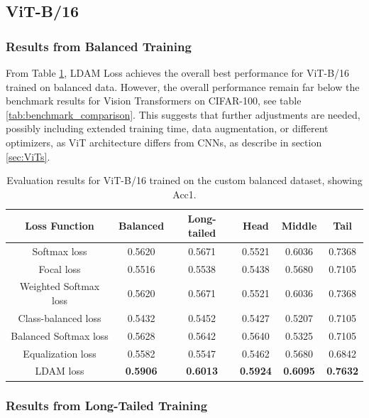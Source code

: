 \subsection{ViT-B/16}

\subsubsection{Results from Balanced Training}

From Table \ref{tab:vit_bal_acc1_1}, LDAM Loss achieves the overall best performance for ViT-B/16 trained on balanced data. However, the overall performance remain far below the benchmark results for Vision Transformers on CIFAR-100, see table \ref{tab:benchmark_comparison}. This suggests that further adjustments are needed, possibly including extended training time, data augmentation, or different optimizers, as ViT architecture differs from CNNs, as describe in section \ref{sec:ViTs}. 

\begin{table}[h!]
    \centering
    \caption{Evaluation results for ViT-B/16 trained on the custom balanced dataset, showing Acc1.}
    \begin{tabular}{cccccc}
        \toprule
        Loss Function & Balanced & Long-tailed & Head & Middle & Tail \\ 
        \midrule
        Softmax loss   & 0.5620 & 0.5671 & 0.5521 & 0.6036 & 0.7368 \\
        Focal loss   & 0.5516 & 0.5538 & 0.5438 & 0.5680 & 0.7105 \\
        Weighted Softmax loss   & 0.5620 & 0.5671 & 0.5521 & 0.6036 & 0.7368 \\
        Class-balanced loss   & 0.5432 & 0.5452 & 0.5427 & 0.5207 & 0.7105 \\
        Balanced Softmax loss   & 0.5628 & 0.5642 & 0.5640 & 0.5325 & 0.7105 \\
        Equalization loss   & 0.5582 & 0.5547 & 0.5462 & 0.5680 & 0.6842 \\
        LDAM loss   & \textbf{0.5906} &  \textbf{0.6013} & \textbf{0.5924} & \textbf{0.6095} & \textbf{0.7632} \\
        \bottomrule
    \end{tabular}
    \label{tab:vit_bal_acc1_1}
\end{table}

\subsubsection{Results from Long-Tailed Training}

